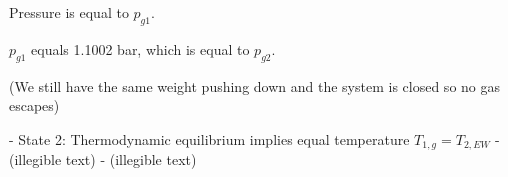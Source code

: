 Pressure is equal to \( p_{g1} \).

\( p_{g1} \) equals 1.1002 bar, which is equal to \( p_{g2} \).

(We still have the same weight pushing down and the system is closed so no gas escapes)

- State 2: Thermodynamic equilibrium implies equal temperature \( T_{1,g} = T_{2,EW} \)
- (illegible text)
- (illegible text)